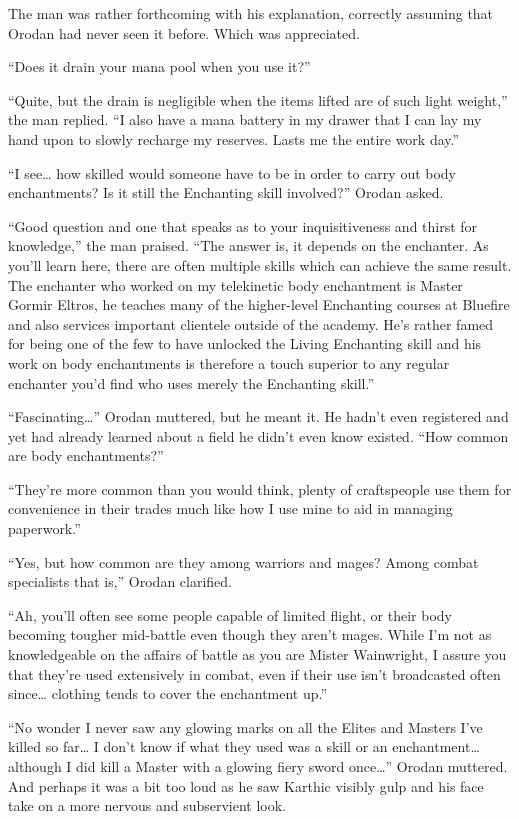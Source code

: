 \documentclass[a4paper,10pt]{book}
\begin{document}
The man was rather forthcoming with his explanation, correctly assuming that Orodan had never seen it before. Which was appreciated.\par
“Does it drain your mana pool when you use it?”\par
“Quite, but the drain is negligible when the items lifted are of such light weight,” the man replied. “I also have a mana battery in my drawer that I can lay my hand upon to slowly recharge my reserves. Lasts me the entire work day.”\par
“I see… how skilled would someone have to be in order to carry out body enchantments? Is it still the Enchanting skill involved?” Orodan asked.\par
“Good question and one that speaks as to your inquisitiveness and thirst for knowledge,” the man praised. “The answer is, it depends on the enchanter. As you’ll learn here, there are often multiple skills which can achieve the same result. The enchanter who worked on my telekinetic body enchantment is Master Gormir Eltros, he teaches many of the higher-level Enchanting courses at Bluefire and also services important clientele outside of the academy. He’s rather famed for being one of the few to have unlocked the Living Enchanting skill and his work on body enchantments is therefore a touch superior to any regular enchanter you’d find who uses merely the Enchanting skill.”\par
“Fascinating…” Orodan muttered, but he meant it. He hadn’t even registered and yet had already learned about a field he didn’t even know existed. “How common are body enchantments?”\par
“They’re more common than you would think, plenty of craftspeople use them for convenience in their trades much like how I use mine to aid in managing paperwork.”\par
“Yes, but how common are they among warriors and mages? Among combat specialists that is,” Orodan clarified.\par
“Ah, you’ll often see some people capable of limited flight, or their body becoming tougher mid-battle even though they aren’t mages. While I’m not as knowledgeable on the affairs of battle as you are Mister Wainwright, I assure you that they’re used extensively in combat, even if their use isn’t broadcasted often since… clothing tends to cover the enchantment up.”\par
“No wonder I never saw any glowing marks on all the Elites and Masters I’ve killed so far… I don’t know if what they used was a skill or an enchantment… although I did kill a Master with a glowing fiery sword once…” Orodan muttered. And perhaps it was a bit too loud as he saw Karthic visibly gulp and his face take on a more nervous and subservient look.\par
\end{document}
